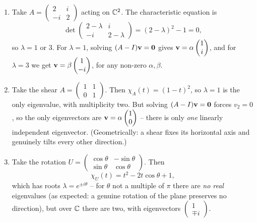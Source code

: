 \documentclass[a4paper]{scrartcl}
\begin{document}
\begin{example}
	\begin{enumerate}[label=(\roman*)]
		\item Take $A = \begin{pmatrix} 2 & i \\ -i & 2 \end{pmatrix}$ acting on $\mathbb{C}^2$. The characteristic equation is
		$$
		\det \begin{pmatrix} 2 - \lambda & i \\ -i & 2 - \lambda\end{pmatrix} = (2 - \lambda)^2 - 1 = 0,
		$$
		so $\lambda = 1$ or $3$. For $\lambda = 1$, solving $(A - I)\mathbf{v} = \mathbf{0}$ gives $\mathbf{v} = \alpha \begin{pmatrix}1 \\ i\end{pmatrix}$, and for $\lambda = 3$ we get $\mathbf{v} = \beta \begin{pmatrix}1 \\ -i\end{pmatrix}$, for any non-zero $\alpha, \beta$.
		\item Take the shear $A = \begin{pmatrix} 1 & 1 \\ 0 & 1\end{pmatrix}$. Then $\chi_A(t) = (1 - t)^2$, so $\lambda = 1$ is the only eigenvalue, with multiplicity two. But solving $(A - I)\mathbf{v} = \mathbf{0}$ forces $v_2 = 0$, so the only eigenvectors are $\mathbf{v} = \alpha\begin{pmatrix}1 \\ 0\end{pmatrix}$ -- there is only \emph{one} linearly independent eigenvector. (Geometrically: a shear fixes its horizontal axis and genuinely tilts every other direction.)
		\item Take the rotation $U = \begin{pmatrix} \cos \theta & -\sin\theta \\ \sin \theta & \cos\theta \end{pmatrix}$. Then
		$$
		\chi_U(t) = t^2 - 2t\cos\theta + 1,
		$$
		which has roots $\lambda = e^{\pm i \theta}$ -- for $\theta$ not a multiple of $\pi$ there are \emph{no real} eigenvalues (as expected: a genuine rotation of the plane preserves no direction), but over $\mathbb{C}$ there are two, with eigenvectors $\begin{pmatrix} 1 \\ \mp i\end{pmatrix}$.
	\end{enumerate}
\end{example}
\end{document}
